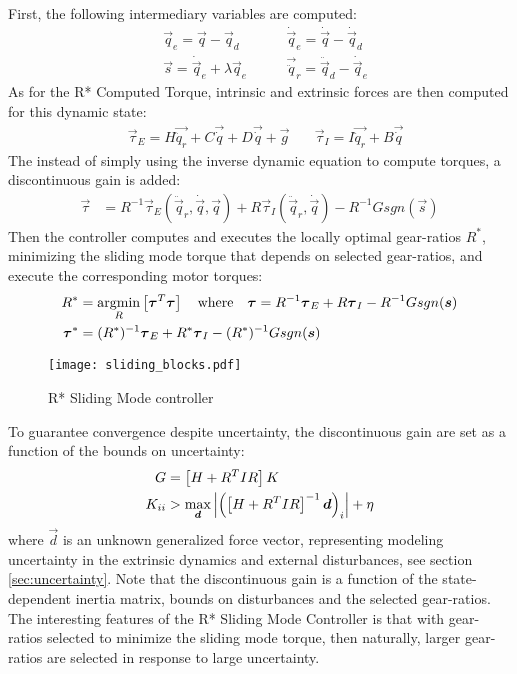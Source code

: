 First, the following intermediary variables are computed:
%
\begin{align}
	&\vec{q}_e        = \vec{q}          -  \vec{q}_d   \quad\quad
	&\dot{\vec{q}}_e  = \dot{\vec{q}}    -  \dot{\vec{q}}_d \\
	&\vec{s}          = \dot{\vec{q}}_e  +  \lambda \vec{q}_e \quad\quad
  &\vec{\ddot{q}}_r = \ddot{\vec{q}}_d -  \dot{\vec{q}}_e 
 \label{eq:slidingvar}
\end{align}
%
As for the R* Computed Torque, intrinsic and extrinsic forces are then computed for this dynamic state:
%
\begin{align}
	&\vec{\tau}_{E} = H \vec{ \ddot{q}_r } + C\vec{ \dot{q} } + D \vec{ \dot{q} } + \vec{ g } \quad
	&\vec{\tau}_{I} = I \vec{ \ddot{q}_r } + B \vec{ \dot{q} } 
\end{align}
%
The instead of simply using the inverse dynamic equation to compute torques, a discontinuous gain is added:
%
\begin{align}
	\vec{\tau} &=  R^{-1} 
	\vec{\tau}_{E}(\ddot{\vec{q}}_r,\dot{\vec{q}},\vec{q}) 
	+ R 
	\vec{\tau}_{I}(\ddot{\vec{q}}_r,\dot{\vec{q}})
  - R^{-1} G sgn( \vec{s} ) 
 \label{eq:slidingctl}
\end{align}
%
Then the controller computes and executes the locally optimal gear-ratios $R^*$, minimizing the sliding mode torque that depends on selected gear-ratios, and execute the corresponding motor torques: 
%
\begin{align}
R^{*} &= \operatornamewithlimits{argmin}\limits_{R} \left[ \vec{\tau}^T\vec{\tau}  \right] \quad\text{where}\quad \vec{\tau} = R^{-1} \vec{\tau}_{E} + R \vec{\tau}_{I} - R^{-1} G sgn( \vec{s} ) 
\\
\vec{\tau}^* &= (R^*)^{-1} \vec{\tau}_{E} + R^* \vec{\tau}_{I} - (R^*)^{-1} G sgn( \vec{s} ) 
\end{align} 
%
\begin{figure}[t]
	\centering
		\texttt{[image: sliding\_blocks.pdf]}
	\caption{R* Sliding Mode controller}
	\label{fig:sliding_blocks}
\end{figure}
%
To guarantee convergence despite uncertainty, the discontinuous gain are set as a function of the bounds on uncertainty:
%
\begin{align}
	G &= \left[ H + R^T I R \right] K \\ K_{ii} &> \operatornamewithlimits{max}\limits_{\vec{d}} \left| \left(  \left[ H + R^T I R \right]^{-1} \vec{d} \right)_{i} \right| + \eta
\end{align}
%
where $\vec{d}$ is an unknown generalized force vector, representing modeling uncertainty in the extrinsic dynamics and external disturbances, see section \ref{sec:uncertainty}. Note that the discontinuous gain is a function of the state-dependent inertia matrix, bounds on disturbances and the selected gear-ratios. The interesting features of the R* Sliding Mode Controller is that with gear-ratios selected to minimize the sliding mode torque, then naturally, larger gear-ratios are selected in response to large uncertainty. 

